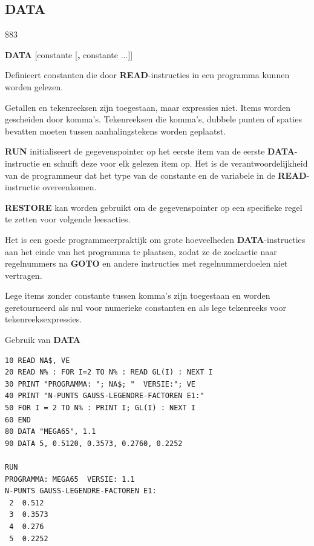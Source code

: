 \subsection{DATA}
\begin{description}[leftmargin=2cm,style=nextline]
\item [Token:]   \$83

\item [Formaat:]  {\bf DATA} [constante [{\bf,} constante ...]]

\item [Gebruik:]   Definieert constanten die door {\bf READ}-instructies in een programma kunnen worden gelezen.

                 Getallen en tekenreeksen zijn toegestaan, maar expressies niet. Items worden gescheiden door komma's. Tekenreeksen die komma's, dubbele punten of spaties bevatten moeten tussen aanhalingstekens worden geplaatst.

                 {\bf RUN} initialiseert de gegevenspointer op het eerste item van de eerste {\bf DATA}-instructie en schuift deze voor elk gelezen item op. Het is de verantwoordelijkheid van de programmeur dat het type van de constante en de variabele in de {\bf READ}-instructie overeenkomen.

                 {\bf RESTORE} kan worden gebruikt om de gegevenspointer op een specifieke regel te zetten voor volgende leesacties.

\item [Opmerkingen:] Het is een goede programmeerpraktijk om grote hoeveelheden {\bf DATA}-instructies aan het einde van het programma te plaatsen, zodat ze de zoekactie naar regelnummers na {\bf GOTO} en andere instructies met regelnummerdoelen niet vertragen.

                  Lege items zonder constante tussen komma's zijn toegestaan en worden geretourneerd als nul voor numerieke constanten en als lege tekenreeks voor tekenreeksexpressies.

\item [Voorbeeld:] Gebruik van {\bf DATA}

\begin{tcolorbox}[colback=black,coltext=white]
\verbatimfont{\codefont}
\begin{verbatim}
10 READ NA$, VE
20 READ N% : FOR I=2 TO N% : READ GL(I) : NEXT I
30 PRINT "PROGRAMMA: "; NA$; "  VERSIE:"; VE
40 PRINT "N-PUNTS GAUSS-LEGENDRE-FACTOREN E1:"
50 FOR I = 2 TO N% : PRINT I; GL(I) : NEXT I
60 END
80 DATA "MEGA65", 1.1
90 DATA 5, 0.5120, 0.3573, 0.2760, 0.2252

RUN
PROGRAMMA: MEGA65  VERSIE: 1.1
N-PUNTS GAUSS-LEGENDRE-FACTOREN E1:
 2  0.512
 3  0.3573
 4  0.276
 5  0.2252
\end{verbatim}
\end{tcolorbox}
\end{description}

